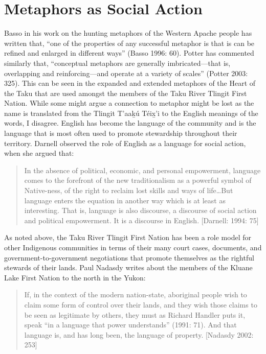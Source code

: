 \section{Metaphors as Social Action}

Basso in his work on the hunting metaphors of the Western Apache people has written that, “one of the properties of any successful metaphor is that is can be refined and enlarged in different ways” (Basso 1996: 60). Potter has commented similarly that, “conceptual metaphors are generally imbricated---that is, overlapping and reinforcing---and operate at a variety of scales” (Potter 2003: 325). This can be seen in the expanded and extended metaphors of the Heart of the Taku that are used amongst the members of the Taku River Tlingit First Nation. While some might argue a connection to metaphor might be lost as the name is translated from the Tlingit T'aak̲ú Téix̲'i to the English meanings of the words, I disagree. English has become the language of the community and is the language that is most often used to promote stewardship throughout their territory. Darnell observed the role of English as a language for social action, when she argued that:

\begin{quote}
In the absence of political, economic, and personal empowerment, language comes to the forefront of the new traditionalism as a powerful symbol of Native-ness, of the right to reclaim lost skills and ways of life…But language enters the equation in another way which is at least as interesting. That is, language is also discourse, a discourse of social action and political empowerment. It is a discourse in English. [Darnell: 1994: 75]
\end{quote}

As noted above, the Taku River Tlingit First Nation has been a role model for other Indigenous communities in terms of their many court cases, documents, and government-to-government negotiations that promote themselves as the rightful stewards of their lands. Paul Nadasdy writes about the members of the Kluane Lake First Nation to the north in the Yukon:

\begin{quote}
If, in the context of the modern nation-state, aboriginal people wish to claim some form of control over their lands, and they wish those claims to be seen as legitimate by others, they must as Richard Handler puts it, speak “in a language that power understands” (1991: 71). And that language is, and has long been, the language of property. [Nadasdy 2002: 253]
\end{quote}


